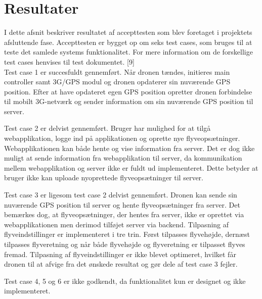 \section{Resultater}

I dette afsnit beskriver resultatet af accepttesten som blev foretaget i projektets afsluttende fase. 
Accepttesten er bygget op om seks test cases, som bruges til at teste det samlede systems funktionalitet. For mere information om de forskellige test cases henvises til test dokumentet. [9] \\

Test case 1 er succesfuldt gennemført. Når dronen tændes, initieres main controller samt 3G/GPS modul og dronen opdaterer sin nuværende GPS position. Efter at have opdateret egen GPS position opretter dronen forbindelse til mobilt 3G-netværk og sender information om sin nuværende GPS position til server.

Test case 2 er delvist gennemført. Bruger har mulighed for at tilgå webapplikation, logge ind på applikationen og oprette nye flyveopsætninger. Webapplikationen kan både hente og vise information fra server. Det er dog ikke muligt at sende information fra webapplikation til server, da kommunikation mellem webapplikation og server ikke er fuldt ud implementeret. Dette betyder at bruger ikke kan uploade nyoprettede flyveopsætninger til server.  

Test case 3 er ligesom test case 2 delvist gennemført. Dronen kan sende sin nuværende GPS position til server og hente flyveopsætninger fra server. Det bemærkes dog, at flyveopsætninger, der hentes fra server, ikke er oprettet via webapplikationen men derimod tilføjet server via backend. 
Tilpasning af flyveindstillinger er implementeret i tre trin. Først tilpasses flyvehøjde, dernæst tilpasses flyveretning og når både flyvehøjde og flyveretning er tilpasset flyves fremad.
Tilpasning af flyveindstillinger er ikke blevet optimeret, hvilket får dronen til at afvige fra det ønskede resultat og gør dele af test case 3 fejler.

Test case 4, 5 og 6 er ikke godkendt, da funktionalitet kun er designet og ikke implementeret.
